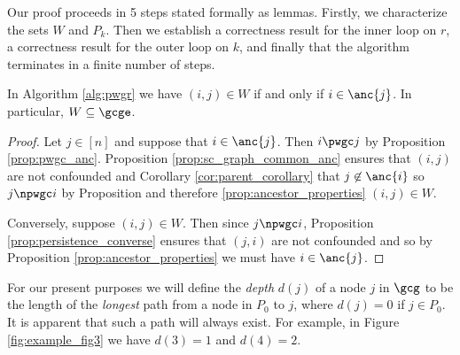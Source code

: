 Our proof proceeds in 5 steps stated formally as lemmas.  Firstly, we
characterize the sets $W$ and $P_k$.  Then we establish a correctness
result for the inner loop on $r$, a correctness result for the outer
loop on $k$, and finally that the algorithm terminates in a finite
number of steps.

\begin{lemma}
  \label{lem:W_subset_E}
  In Algorithm \ref{alg:pwgr} we have
  $(i, j) \in W$ if and only if $i \in \anc{j}$.  In particular,
  $W \subseteq \gcge$.
\end{lemma}
\begin{proof}
  Let $j \in [n]$ and suppose that $i \in \anc{j}$.  Then $i \pwgc j$
  by Proposition \ref{prop:pwgc_anc}.  Proposition
  \ref{prop:sc_graph_common_anc} ensures that $(i, j)$ are not
  confounded and Corollary \ref{cor:parent_corollary} that
  $j \not\in \anc{i}$ so $j \npwgc i$ by Proposition and therefore
  \ref{prop:ancestor_properties} $(i, j) \in W$.

  Conversely, suppose $(i, j) \in W$.  Then since $j \npwgc i$,
  Proposition \ref{prop:persistence_converse} ensures that $(j, i)$
  are not confounded and so by Proposition \ref{prop:ancestor_properties}
  we must have $i \in \anc{j}$.
\end{proof}

\begin{definition}[Depth]
  For our present purposes we will define the \textit{depth} $d(j)$ of
  a node $j$ in $\gcg$ to be the length of the \textit{longest} path
  from a node in $P_0$ to $j$, where $d(j) = 0$ if $j \in P_0$.  It is
  apparent that such a path will always exist.  For example, in Figure
  \ref{fig:example_fig3} we have $d(3) = 1$ and $d(4) = 2$.
\end{definition}

